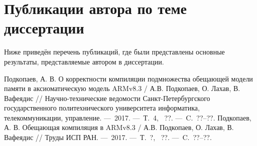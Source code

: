 





\section*{\LARGE Публикации автора по теме диссертации}

Ниже приведён перечень публикаций, где были представлены основные результаты, представляемые автором в диссертации. \\

\renewcommand{\bibsection}{\noindent \textbf{\refname}}

\renewcommand{\refname}{Статьи из ``Перечня рецензируемых научных изданий, в которых должны быть опубликованы основные научные результаты диссертаций на соискание ученой степени кандидата наук, на соискание ученой степени доктора наук'', сформированного согласно требованиям, установленным Министерством образования и науки Российской Федерации}
\begin{thebibliography}{99}
 Подкопаев, А. В. О корректности компиляции подмножества обещающей модели памяти в аксиоматическую модель ARMv8.3 / А.В. Подкопаев, О. Лахав, В. Вафеядис // Научно-технические ведомости Санкт-Петербургского государственного политехнического университета информатика, телекоммуникации, управление. ---~2017. ---~Т.~4, \textnumero~??. ---~C.~??--??.
 Подкопаев, А. В. Обещающая компиляция в ARMv8.3 / А.В. Подкопаев, О. Лахав, В. Вафеядис // Труды ИСП РАН. ---~2017. ---~Т.~?, \textnumero~??. ---~C.~??--??.
\setcounter{firstbib}{\value{enumiv}}
\end{thebibliography}

